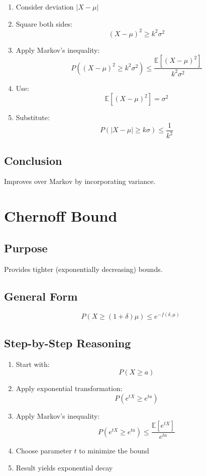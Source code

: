 \documentclass[12pt]{article}
\begin{document}
\begin{enumerate}
\item Consider deviation $|X - \mu|$
\item Square both sides:
\[
(X - \mu)^2 \ge k^2 \sigma^2
\]
\item Apply Markov's inequality:
\[
P((X - \mu)^2 \ge k^2 \sigma^2)
\le \frac{\mathbb{E}[(X - \mu)^2]}{k^2 \sigma^2}
\]
\item Use:
\[
\mathbb{E}[(X - \mu)^2] = \sigma^2
\]
\item Substitute:
\[
P(|X - \mu| \ge k\sigma) \le \frac{1}{k^2}
\]
\end{enumerate}

\subsection{Conclusion}

Improves over Markov by incorporating variance.

\section{Chernoff Bound}

\subsection{Purpose}

Provides tighter (exponentially decreasing) bounds.

\subsection{General Form}

\[
P(X \ge (1+\delta)\mu) \le e^{-f(\delta,\mu)}
\]

\subsection{Step-by-Step Reasoning}

\begin{enumerate}
\item Start with:
\[
P(X \ge a)
\]
\item Apply exponential transformation:
\[
P(e^{tX} \ge e^{ta})
\]
\item Apply Markov's inequality:
\[
P(e^{tX} \ge e^{ta}) \le \frac{\mathbb{E}[e^{tX}]}{e^{ta}}
\]
\item Choose parameter $t$ to minimize the bound
\item Result yields exponential decay
\end{enumerate}
\end{document}
